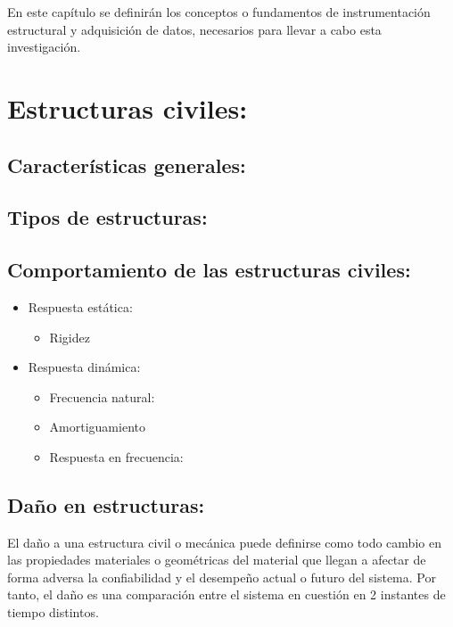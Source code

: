 
En este capítulo se definirán los conceptos  o fundamentos de instrumentación estructural y adquisición de datos, necesarios para llevar a cabo esta investigación.

\section{Estructuras civiles:}

\subsection{Características generales:}

\subsection{Tipos de estructuras:}

\subsection{Comportamiento de las estructuras civiles:}

\begin{itemize}
    \item{Respuesta estática:}
        \begin{itemize}
            \item Rigidez
        \end{itemize}

    \item{Respuesta dinámica:}
        \begin{itemize}
            \item Frecuencia natural:
            \item Amortiguamiento
            \item Respuesta en frecuencia:
        \end{itemize}
\end{itemize}


\subsection{Daño en estructuras:}

El daño a una estructura civil o mecánica puede definirse como todo cambio en las propiedades materiales o geométricas del material que llegan a afectar de forma adversa la confiabilidad y el desempeño actual o futuro del sistema. Por tanto, el daño es una comparación entre el sistema en cuestión en 2 instantes de tiempo distintos.

